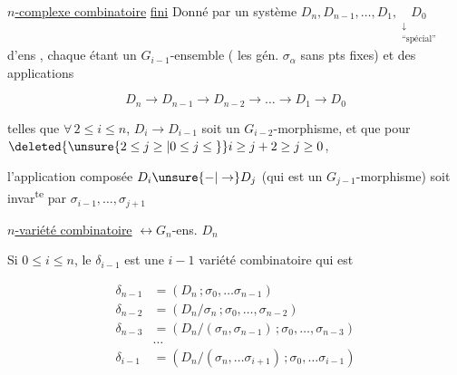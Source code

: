 \uline{$n$-complexe combinatoire} \uline{fini} Donné par un système $D_n,D_{n-1},\ldots,D_1,\underset{\substack{\downarrow\\\text{``spécial''}}}{D_0}$ d'ens , chaque  étant un  $G_{i-1}$-ensemble ( les gén. $\sigma_\alpha$  sans pts fixes) et des applications

\[
 D_n\to D_{n-1}\longrightarrow D_{n-2}\longrightarrow\ldots\longrightarrow D_1\longrightarrow D_0
\]

telles que $\forall\,2\leq i\leq n$, $D_i\to D_{i-1}$ soit un $G_{i-2}$-morphisme, et que pour $\deleted{\unsure{2\leq j\geq{}|0\leq j\leq{}}}i\geq j+2\geq j\geq0$,


l'application composée $D_i\unsure{-|\to}D_j$ (qui est un $G_{j-1}$-morphisme) soit invar\textsuperscript{te} par $\sigma_{i-1},\ldots,\sigma_{j+1}$

\uline{$n$-variété combinatoire} $\leftrightarrow G_n$-ens. $D_n$

Si $0\leq i\leq n$, le   $\delta_{i-1}$  est une $i-1$ variété combinatoire qui est

\[
\begin{aligned}
\delta_{n-1}&=(D_n\,;\sigma_0,\ldots\sigma_{n-1})\\
\delta_{n-2}&=(D_n/\sigma_n\,;\sigma_0,\ldots,\sigma_{n-2})\\
\delta_{n-3}&=(D_n/(\sigma_n,\sigma_{n-1})\,;\sigma_0,\ldots,\sigma_{n-3})\\
&\ldots\\
\delta_{i-1}&=(D_n/(\sigma_n,\ldots\sigma_{i+1})\,;\sigma_0,\ldots\sigma_{i-1})
\end{aligned}
\]


